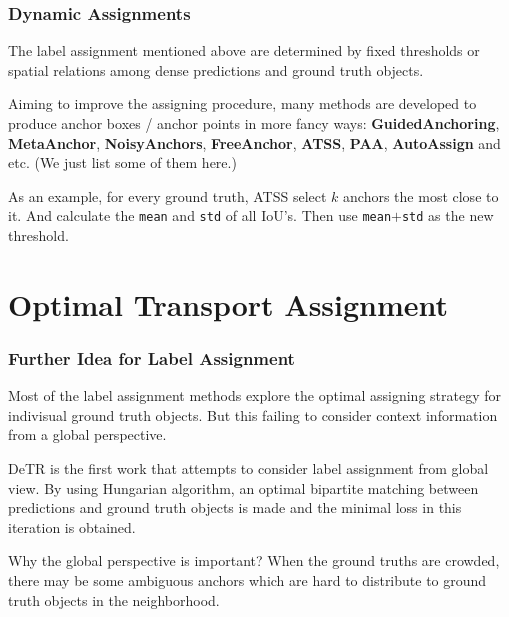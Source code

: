 \documentclass[slidetop, mathserif, dvipsnames]{beamer}
\begin{document}
\begin{frame}
    \frametitle{Dynamic Assignments}

    The label assignment mentioned above are determined by fixed thresholds
    or spatial relations among dense predictions and ground truth objects.

    \quad

    Aiming to improve the assigning procedure, many methods are developed
    to produce anchor boxes / anchor points in more fancy ways:
    {\bf GuidedAnchoring}, {\bf MetaAnchor}, {\bf NoisyAnchors},
    {\bf FreeAnchor}, {\bf ATSS}, {\bf PAA}, {\bf AutoAssign} and etc.
    (We just list some of them here.)

    \quad

    As an example, for every ground truth, ATSS select $k$ anchors the most
    close to it. And calculate the {\tt mean} and {\tt std} of all IoU's.
    Then use {\tt mean$+$std} as the new threshold.

\end{frame}

\section{Optimal Transport Assignment}

\begin{frame}
    \frametitle{Further Idea for Label Assignment}

    Most of the label assignment methods explore the optimal assigning strategy
    for indivisual ground truth objects.
    But this failing to consider context information from a global perspective.

    \quad

    DeTR is the first work that attempts to consider label assignment from
    global view. By using Hungarian algorithm,
    an optimal bipartite matching between predictions
    and ground truth objects is made and the minimal loss in this iteration
    is obtained.

    \quad

    Why the global perspective is important?
    When the ground truths are crowded, there may be some ambiguous
    anchors which are hard to distribute to ground truth
    objects in the neighborhood.

\end{frame}
\end{document}
